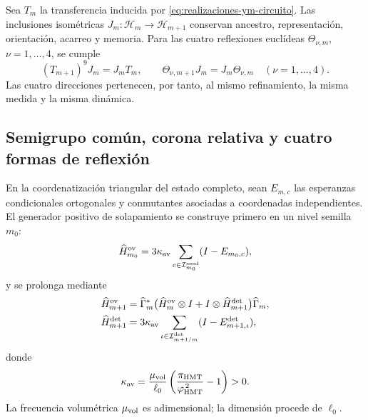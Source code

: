 Sea \(T_m\) la transferencia inducida por
\eqref{eq:realizaciones-ym-circuito}. Las inclusiones isométricas
\(J_m:\mathcal H_m\to\mathcal H_{m+1}\) conservan ancestro,
representación, orientación, acarreo y memoria. Para las cuatro reflexiones
euclídeas \(\Theta_{\nu,m}\), \(\nu=1,\ldots,4\), se cumple
\begin{equation}\label{eq:realizaciones-ym-entrelazamiento}
 (T_{m+1})^9J_m=J_mT_m,
 \qquad
 \Theta_{\nu,m+1}J_m=J_m\Theta_{\nu,m}
 \quad(\nu=1,\ldots,4).
\end{equation}
Las cuatro direcciones pertenecen, por tanto, al mismo refinamiento, la misma
medida y la misma dinámica.

\subsection*{Semigrupo común, corona relativa y cuatro formas de reflexión}

En la coordenatización triangular del estado completo, sean \(E_{m,c}\) las esperanzas
condicionales ortogonales y conmutantes asociadas a coordenadas
independientes. El generador positivo de solapamiento se construye primero en
un nivel semilla \(m_0\):
\begin{equation}\label{eq:realizaciones-ym-generador}
 \widehat H_{m_0}^{\rm ov}
 =3\kappa_{\rm av}
  \sum_{c\in\mathcal I_{m_0}^{\rm seed}}(I-E_{m_0,c}),
\end{equation}
y se prolonga mediante
\begin{equation}\label{eq:realizaciones-ym-generador-refinado}
 \begin{aligned}
 \widehat H_{m+1}^{\rm ov}
 &=\widehat\Gamma_m^*
   \bigl(\widehat H_m^{\rm ov}\otimes I+
         I\otimes\widehat H_{m+1}^{\rm det}\bigr)
   \widehat\Gamma_m,\\
 \widehat H_{m+1}^{\rm det}
 &=3\kappa_{\rm av}
   \sum_{\iota\in\mathcal I_{m+1/m}^{\rm det}}
   (I-E_{m+1,\iota}^{\rm det}),
 \end{aligned}
\end{equation}
donde
\begin{equation}\label{eq:realizaciones-ym-kappa}
 \kappa_{\rm av}
 =\frac{\mu_{\rm vol}}{\ell_0}
  \left(\frac{\pi_{\rm HMT}}{\varphi_{\rm HMT}^{\,2}}-1\right)>0.
\end{equation}
La frecuencia volumétrica \(\mu_{\rm vol}\) es adimensional; la dimensión
procede de \(\ell_0\).

